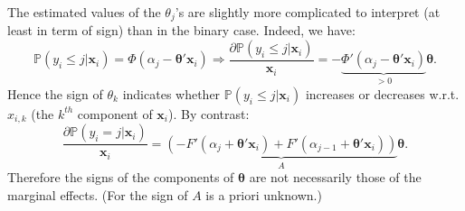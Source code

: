 \documentclass[
  12pt,
]{book}
\theoremstyle{definition}
\theoremstyle{definition}
\theoremstyle{definition}
\theoremstyle{definition}
\theoremstyle{remark}
\begin{document}
The estimated values of the \(\theta_j\)'s are slightly more complicated to interpret (at least in term of sign) than in the binary case. Indeed, we have:
\[
\mathbb{P}(y_i \le j | \mathbf{x}_i) = \Phi(\alpha_{j} - \boldsymbol\theta'\mathbf{x}_i) \Rightarrow \frac{\partial \mathbb{P}(y_i \le j | \mathbf{x}_i)}{\mathbf{x}_i} =- \underbrace{\Phi'(\alpha_{j} - \boldsymbol\theta'\mathbf{x}_i)}_{>0}\boldsymbol\theta.
\]
Hence the sign of \(\theta_k\) indicates whether \(\mathbb{P}(y_i \le j | \mathbf{x}_i)\) increases or decreases w.r.t. \(x_{i,k}\) (the \(k^{th}\) component of \(\mathbf{x}_i\)). By contrast:
\[
\frac{\partial \mathbb{P}(y_i = j | \mathbf{x}_i)}{\mathbf{x}_i} = \underbrace{\left(-F'(\alpha_{j} + \boldsymbol\theta'\mathbf{x}_i)+F'(\alpha_{j-1} + \boldsymbol\theta'\mathbf{x}_i)\right)}_{A}\boldsymbol\theta.
\]
Therefore the signs of the components of \(\boldsymbol\theta\) are not necessarily those of the marginal effects. (For the sign of \(A\) is a priori unknown.)
\end{document}
